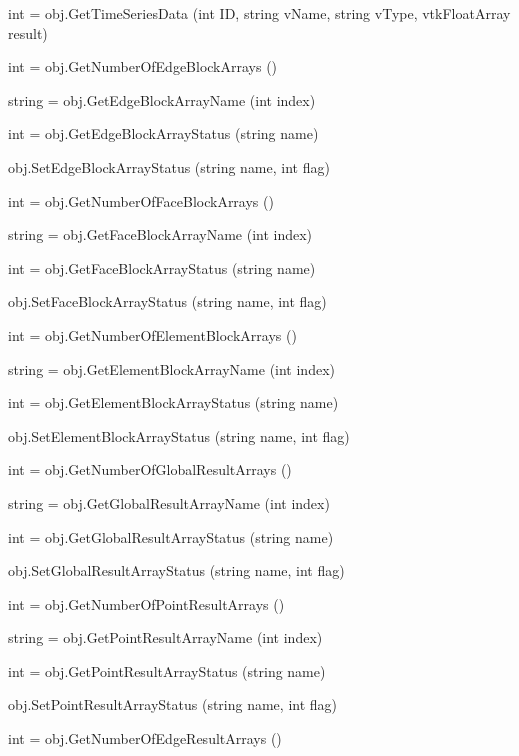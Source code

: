 \begin{DoxyItemize}
\item {\ttfamily int = obj.\-Get\-Time\-Series\-Data (int I\-D, string v\-Name, string v\-Type, vtk\-Float\-Array result)}  
\item {\ttfamily int = obj.\-Get\-Number\-Of\-Edge\-Block\-Arrays ()}  
\item {\ttfamily string = obj.\-Get\-Edge\-Block\-Array\-Name (int index)}  
\item {\ttfamily int = obj.\-Get\-Edge\-Block\-Array\-Status (string name)}  
\item {\ttfamily obj.\-Set\-Edge\-Block\-Array\-Status (string name, int flag)}  
\item {\ttfamily int = obj.\-Get\-Number\-Of\-Face\-Block\-Arrays ()}  
\item {\ttfamily string = obj.\-Get\-Face\-Block\-Array\-Name (int index)}  
\item {\ttfamily int = obj.\-Get\-Face\-Block\-Array\-Status (string name)}  
\item {\ttfamily obj.\-Set\-Face\-Block\-Array\-Status (string name, int flag)}  
\item {\ttfamily int = obj.\-Get\-Number\-Of\-Element\-Block\-Arrays ()}  
\item {\ttfamily string = obj.\-Get\-Element\-Block\-Array\-Name (int index)}  
\item {\ttfamily int = obj.\-Get\-Element\-Block\-Array\-Status (string name)}  
\item {\ttfamily obj.\-Set\-Element\-Block\-Array\-Status (string name, int flag)}  
\item {\ttfamily int = obj.\-Get\-Number\-Of\-Global\-Result\-Arrays ()}  
\item {\ttfamily string = obj.\-Get\-Global\-Result\-Array\-Name (int index)}  
\item {\ttfamily int = obj.\-Get\-Global\-Result\-Array\-Status (string name)}  
\item {\ttfamily obj.\-Set\-Global\-Result\-Array\-Status (string name, int flag)}  
\item {\ttfamily int = obj.\-Get\-Number\-Of\-Point\-Result\-Arrays ()}  
\item {\ttfamily string = obj.\-Get\-Point\-Result\-Array\-Name (int index)}  
\item {\ttfamily int = obj.\-Get\-Point\-Result\-Array\-Status (string name)}  
\item {\ttfamily obj.\-Set\-Point\-Result\-Array\-Status (string name, int flag)}  
\item {\ttfamily int = obj.\-Get\-Number\-Of\-Edge\-Result\-Arrays ()}  

\end{DoxyItemize}
